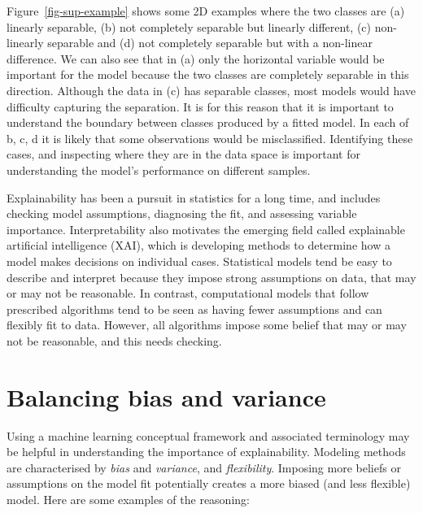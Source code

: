 \documentclass[
  letterpaper,
]{krantz}
\begin{document}
Figure~\ref{fig-sup-example} shows some 2D examples where the two
classes are (a) linearly separable, (b) not completely separable but
linearly different, (c) non-linearly separable and (d) not completely
separable but with a non-linear difference. We can also see that in (a)
only the horizontal variable would be important for the model because
the two classes are completely separable in this direction. Although the
data in (c) has separable classes, most models would have difficulty
capturing the separation. It is for this reason that it is important to
understand the boundary between classes produced by a fitted model. In
each of b, c, d it is likely that some observations would be
misclassified. Identifying these cases, and inspecting where they are in
the data space is important for understanding the model's performance on
different samples.

Explainability has been a pursuit in statistics for a long time, and
includes checking model assumptions, diagnosing the fit, and assessing
variable importance. Interpretability also motivates the emerging field
called explainable artificial intelligence (XAI), which is developing
methods to determine how a model makes decisions on individual cases.
Statistical models tend be easy to describe and interpret because they
impose strong assumptions on data, that may or may not be reasonable. In
contrast, computational models that follow prescribed algorithms tend to
be seen as having fewer assumptions and can flexibly fit to data.
However, all algorithms impose some belief that may or may not be
reasonable, and this needs checking.

\section{Balancing bias and variance}\label{balancing-bias-and-variance}

Using a machine learning conceptual framework and associated terminology
may be helpful in understanding the importance of explainability.
Modeling methods are characterised by \emph{bias} and \emph{variance},
and \emph{flexibility}. Imposing more beliefs or assumptions on the
model fit potentially creates a more biased (and less flexible) model.
Here are some examples of the reasoning:
\end{document}

